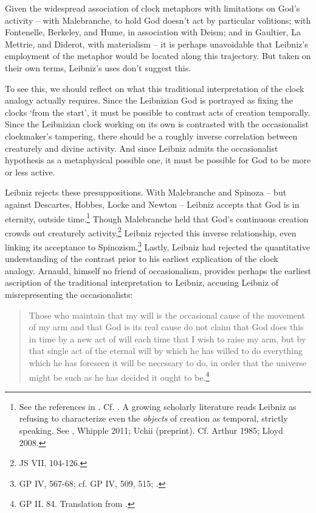 \documentclass{article}
\begin{document}
Given the widespread association of clock metaphors with limitations on
God's activity -- with Malebranche, to hold God doesn't act by
particular volitions; with Fontenelle, Berkeley, and Hume, in
association with Deism; and in Gaultier, La Mettrie, and Diderot, with
materialism -- it is perhaps unavoidable that Leibniz's employment of
the metaphor would be located along this trajectory. But taken on their
own terms, Leibniz's uses don't suggest this.

To see this, we should reflect on what this traditional interpretation
of the clock analogy actually requires. Since the Leibnizian God is
portrayed as fixing the clocks `from the start', it must be possible to
contrast acts of creation temporally. Since the Leibnizian clock working
on its own is contrasted with the occasionalist clockmaker's tampering,
there should be a roughly inverse correlation between creaturely and
divine activity. And since Leibniz admits the occasionalist hypothesis
as a metaphysical possible one, it must be possible for God to be more
or less active.

Leibniz rejects these presuppositions. With Malebranche and Spinoza --
but against Descartes, Hobbes, Locke and Newton -- Leibniz accepts that
God is in eternity, outside time.\footnote{See the references in \autocite[414]{Gorham2008}. Cf. \autocite[250]{Jolley2002}. A growing scholarly literature reads
  Leibniz as refusing to characterize even the \emph{objects} of
  creation as temporal, strictly speaking. See \autocite{Whipple2010}, Whipple 2011; Uchii
  (preprint). Cf. Arthur 1985; Lloyd 2008.} Though Malebranche held that
God's continuous creation crowds out creaturely activity,\footnote{JS
  VII, 104-126.} Leibniz rejected this inverse relationship, even
linking its acceptance to Spinozism.\footnote{GP IV, 567-68; cf. GP IV,
  509, 515; \autocite[318-320]{Bobro2008}.} Lastly, Leibniz had rejected the
quantitative understanding of the contrast prior to his earliest
explication of the clock analogy. Arnauld, himself no friend of
occasionalism, provides perhaps the earliest ascription of the
traditional interpretation to Leibniz, accusing Leibniz of
misrepresenting the occasionalists:

\begin{quote}
Those who maintain that my will is the occasional cause of the movement
of my arm and that God is its real cause do not claim that God does this
in time by a new act of will each time that I wish to raise my arm, but
by that single act of the eternal will by which he has willed to do
everything which he has foreseen it will be necessary to do, in order
that the universe might be such as he has decided it ought to
be.\footnote{GP II. 84. Translation from \autocite[246]{Jolley2002}.}
\end{quote}
\end{document}

